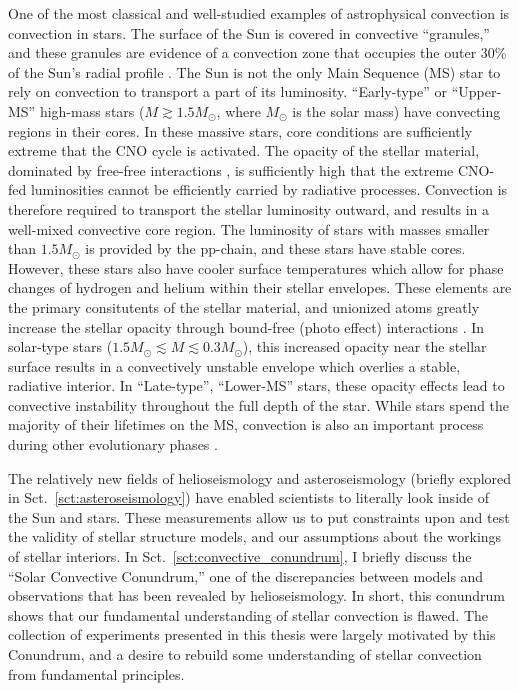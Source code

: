 One of the most classical and well-studied examples of astrophysical convection is convection in stars.
The surface of the Sun is covered in convective ``granules,'' and these granules are evidence of a convection zone that occupies the outer 30\% of the Sun's radial profile \citep{miesch2005, nordlund&all2009}.
The Sun is not the only Main Sequence (MS) star to rely on convection to transport a part of its luminosity.
``Early-type'' or ``Upper-MS'' high-mass stars ($M \gtrsim 1.5 M_\odot$, where $M_\odot$ is the solar mass) have convecting regions in their cores.
In these massive stars, core conditions are sufficiently extreme that the CNO cycle is activated.
The opacity of the stellar material, dominated by free-free interactions \citep[c.f.~Ch.~16 of][]{weiss&all2004}, is sufficiently high that the extreme CNO-fed luminosities cannot be efficiently carried by radiative processes.
Convection is therefore required to transport the stellar luminosity outward, and results in a well-mixed convective core region.
The luminosity of stars with masses smaller than $1.5 M_\odot$ is provided by the pp-chain, and these stars have stable cores.
However, these stars also have cooler surface temperatures which allow for phase changes of hydrogen and helium within their stellar envelopes.
These elements are the primary consitutents of the stellar material, and unionized atoms greatly increase the stellar opacity through bound-free (photo effect) interactions \citep[these effects were first studied in detail by ][]{rast&toomre1993a, rast&toomre1993b}.
In solar-type stars ($1.5 M_\odot \lesssim M \lesssim 0.3 M_\odot$), this increased opacity near the stellar surface results in a convectively unstable envelope which overlies a stable, radiative interior.
In ``Late-type'', ``Lower-MS'' stars, these opacity effects lead to convective instability throughout the full depth of the star.
While stars spend the majority of their lifetimes on the MS, convection is also an important process during other evolutionary phases \citep[and I refer the reader to chapter 2 of][for a broad but brief overview of stellar evolutionary phases]{HKT}.

The relatively new fields of helioseismology and asteroseismology (briefly explored in Sct.~\ref{sct:asteroseismology}) have enabled scientists to literally look inside of the Sun and stars.
These measurements allow us to put constraints upon and test the validity of stellar structure models, and our assumptions about the workings of stellar interiors.
In Sct.~\ref{sct:convective_conundrum}, I briefly discuss the ``Solar Convective Conundrum,'' one of the discrepancies between models and observations that has been revealed by helioseismology.
In short, this conundrum shows that our fundamental understanding of stellar convection is flawed.
The collection of experiments presented in this thesis were largely motivated by this Conundrum, and a desire to rebuild some understanding of stellar convection from fundamental principles.

